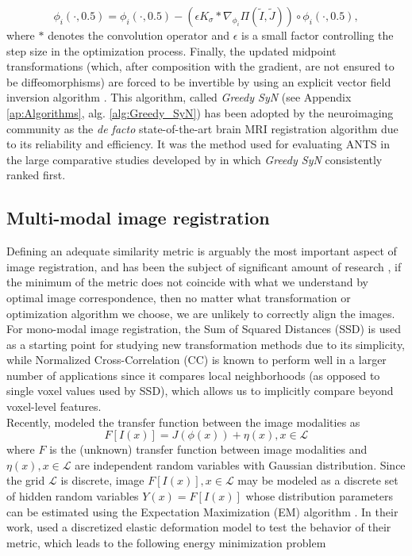 \begin{equation}\label{eq:gsyn_update}
    \phi_{i}(\cdot, 0.5) = \phi_{i}(\cdot, 0.5) - \left( \epsilon K_{\sigma} \ast \nabla_{\phi_{i}} \Pi(\tilde{I}, \tilde{J}) \right) \circ \phi_{i}(\cdot, 0.5),
\end{equation}
where $\ast$ denotes the convolution operator and $\epsilon$ is a small factor controlling the step size in the optimization process. Finally, the updated midpoint transformations (which, after composition with the gradient, are not ensured to be diffeomorphisms) are forced to be invertible by using an explicit vector field inversion algorithm \citep{Chen2008}. This algorithm, called \textit{Greedy SyN} (see Appendix \ref{ap:Algorithms}, alg. \ref{alg:Greedy_SyN}) has been adopted by the neuroimaging community as the \textit{de facto} state-of-the-art brain MRI registration algorithm due to its reliability and efficiency. It was the method used for evaluating ANTS \citep{Avants2011} in the large comparative studies developed by \cite{Klein2009, Klein2010} in which \textit{Greedy SyN} consistently ranked first.

\subsection{Multi-modal image registration}

Defining an adequate similarity metric is arguably the most important aspect of image registration, and has been the subject of significant amount of research \citep{Sotiras2013}, if the minimum of the metric does not coincide with what we understand by optimal image correspondence, then no matter what transformation or optimization algorithm we choose, we are unlikely to correctly align the images. For mono-modal image registration, the Sum of Squared Distances (SSD) is used as a starting point for studying new transformation methods due to its simplicity, while Normalized Cross-Correlation (CC) is known to perform well in a larger number of applications since it compares local neighborhoods (as opposed to single voxel values used by SSD), which allows us to implicitly compare beyond voxel-level features.\\

Recently, \cite{Arce-santana2014} modeled the transfer function between the image modalities as
\begin{equation}\label{eq:arce_model}
    F[I(x)] = J(\phi(x)) + \eta(x), x\in \mathcal{L}
\end{equation}
where $F$ is the (unknown) transfer function between image modalities and $\eta(x), x\in \mathcal{L}$ are independent random variables with Gaussian distribution. Since the grid $\mathcal{L}$ is discrete, image $F[I(x)], x\in \mathcal{L}$ may be modeled as a discrete set of hidden random variables $Y(x) = F[I(x)]$ whose distribution parameters
can be estimated using the Expectation Maximization (EM) algorithm \citep{Dempster1977}. In their work, \cite{Arce-santana2014} used a discretized elastic
deformation model to test the behavior of their metric, which leads to the following energy minimization problem

